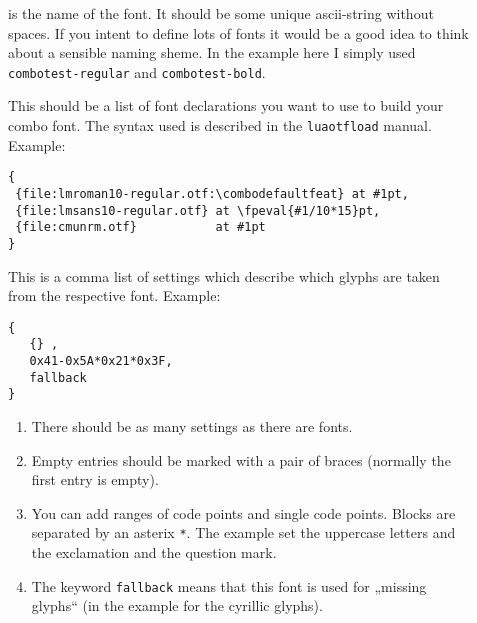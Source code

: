 \documentclass[parskip=half-,egregdoesnotlikesansseriftitles]{scrartcl}
\newcommand\package[1]{\texttt{#1}}
\begin{document}
\begin{description}
  \item[] is the name of the font. It should be some unique ascii-string without spaces. If you intent to define lots of fonts it would be a good idea to think about a sensible naming sheme. In the example here I simply used \texttt{combotest-regular} and \texttt{combotest-bold}.

  \item[] This should be a list of font declarations you want to use to build your combo font. The syntax used is described in the \package{luaotfload} manual. Example:

\begin{verbatim}
{
 {file:lmroman10-regular.otf:\combodefaultfeat} at #1pt,
 {file:lmsans10-regular.otf} at \fpeval{#1/10*15}pt,
 {file:cmunrm.otf}           at #1pt
}
\end{verbatim}


\item[] This is a comma list of settings which describe which glyphs are taken from the respective font. Example:

\begin{verbatim}
{
   {} ,
   0x41-0x5A*0x21*0x3F,
   fallback
}
\end{verbatim}

\begin{enumerate}
\item There should be as many settings as there are fonts.
\item Empty entries should be marked with a pair of braces (normally the first entry is empty).
\item You can add ranges of code points and single code points. Blocks are separated by an asterix \verb+*+. The example set the uppercase letters and the exclamation and the question mark.
\item The keyword \texttt{fallback} means that this font is used for „missing glyphs“ (in the example for the cyrillic glyphs).
\end{enumerate}
\end{description}
\end{document}
